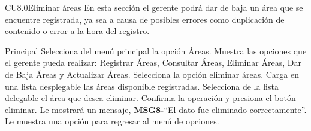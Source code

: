 

	\begin{UseCase}{CU8.0}{Eliminar áreas}{
		En esta sección el gerente podrá dar de baja un área que se encuentre registrada, ya sea a 				causa de posibles errores como duplicación de contenido o error a la hora del registro.
	}
	\end{UseCase}

\begin{UCtrayectoria}{Principal}
		\UCpaso[\UCactor] Selecciona del menú principal la opción Áreas.
		\UCpaso Muestra las opciones que el gerente pueda realizar: Registrar Áreas, Consultar Áreas, Eliminar Áreas, Dar de Baja Áreas y Actualizar Áreas.
		\UCpaso[\UCactor] Selecciona la opción eliminar áreas.
		\UCpaso Carga en una lista desplegable las áreas disponible registradas.
		\UCpaso[\UCactor] Selecciona de la lista delegable el área que desea eliminar.
		\UCpaso[\UCactor] Confirma la operación y presiona el botón eliminar.
		\UCpaso Le mostrará un mensaje, {\bf MSG8-}``El dato fue eliminado correctamente''.
		\UCpaso Le muestra una opción para regresar al menú de opciones.
	\end{UCtrayectoria}